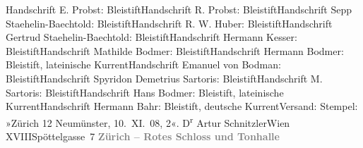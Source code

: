 \begin{ledgroupsized}[t]{13cm}
{\newline{}Handschrift E. Probst: Bleistift\newline{}Handschrift R. Probst: Bleistift\newline{}Handschrift Sepp Staehelin-Baechtold: Bleistift\newline{}Handschrift R. W. Huber: Bleistift\newline{}Handschrift Gertrud Staehelin-Baechtold: Bleistift\newline{}Handschrift Hermann Kesser: Bleistift\newline{}Handschrift Mathilde Bodmer: Bleistift\newline{}Handschrift Hermann Bodmer: Bleistift, lateinische Kurrent\newline{}Handschrift Emanuel von Bodman: Bleistift\newline{}Handschrift Spyridon Demetrius Sartoris: Bleistift\newline{}Handschrift M. Sartoris: Bleistift\newline{}Handschrift Hans Bodmer: Bleistift, lateinische Kurrent\newline{}Handschrift Hermann Bahr: Bleistift, deutsche Kurrent\newline{}Versand: Stempel: »\nobreak{}Zürich 12 Neumünster, 10. XI. 08, 2\nobreak{}«.  }\toendnotes[C]{\smallbreak}\pstart{}{\pb}D\textsuperscript{r} Artur
                  Schnitzler\pend{}\pstart{}Wien XVIII\pend{}\pstart{}Spöttelgasse 7\pend{}{\bigskip}\pstart
           \noindent{}\centering{}{\pb}\textcolor{gray}{\textbf{Zürich – Rotes Schloss und Tonhalle}}\pend

\end{ledgroupsized}
